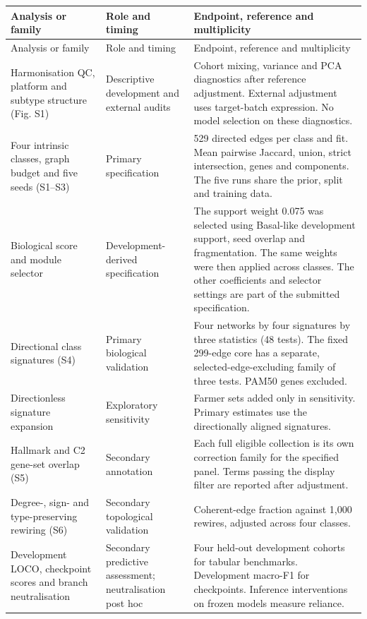 \begin{longtable}{@{}p{.245\linewidth}p{.225\linewidth}p{.475\linewidth}@{}}
\toprule Analysis or family & Role and timing & Endpoint, reference and multiplicity \\ \midrule
\endfirsthead
\toprule Analysis or family & Role and timing & Endpoint, reference and multiplicity \\ \midrule
\endhead
Harmonisation QC, platform and subtype structure (Fig. S1) & Descriptive development and external audits & Cohort mixing, variance and PCA diagnostics after reference adjustment. External adjustment uses target-batch expression. No model selection on these diagnostics.\\
Four intrinsic classes, graph budget and five seeds (S1--S3) & Primary specification & 529 directed edges per class and fit. Mean pairwise Jaccard, union, strict intersection, genes and components. The five runs share the prior, split and training data.\\
Biological score and module selector & Development-derived specification & The support weight 0.075 was selected using Basal-like development support, seed overlap and fragmentation. The same weights were then applied across classes. The other coefficients and selector settings are part of the submitted specification.\\
Directional class signatures (S4) & Primary biological validation & Four networks by four signatures by three statistics (48 tests). The fixed 299-edge core has a separate, selected-edge-excluding family of three tests. PAM50 genes excluded.\\
Directionless signature expansion & Exploratory sensitivity & Farmer sets added only in sensitivity. Primary estimates use the directionally aligned signatures.\\
Hallmark and C2 gene-set overlap (S5) & Secondary annotation & Each full eligible collection is its own correction family for the specified panel. Terms passing the display filter are reported after adjustment.\\
Degree-, sign- and type-preserving rewiring (S6) & Secondary topological validation & Coherent-edge fraction against 1,000 rewires, adjusted across four classes.\\
Development LOCO, checkpoint scores and branch neutralisation & Secondary predictive assessment; neutralisation post hoc & Four held-out development cohorts for tabular benchmarks. Development macro-F1 for checkpoints. Inference interventions on frozen models measure reliance.\\

\end{longtable}
